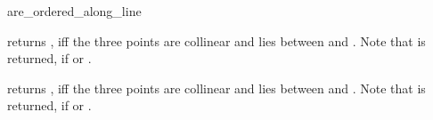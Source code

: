 \begin{ccRefFunction}{are_ordered_along_line}

         {returns , iff the three points are collinear and 
           lies between  and .
          Note that  is returned, if  or
          .}


         {returns , iff the three points are collinear and 
           lies between  and .
          Note that  is returned, if  or
          .}
\end{ccRefFunction}

